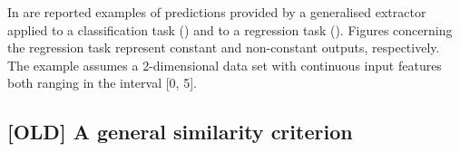 \documentclass[
]{ceurart}
\begin{document}
In  are reported examples of predictions provided by a generalised extractor applied to a classification task () and to a regression task ().
%
Figures concerning the regression task represent constant and non-constant outputs, respectively.
%
The example assumes a 2-dimensional data set with continuous input features both ranging in the interval [0, 5].

%
%
%
%
%
%

%
%

\subsection{[OLD] A general similarity criterion}
\end{document}
